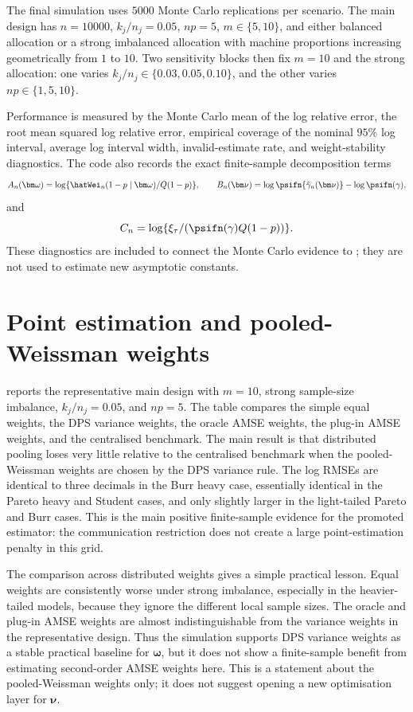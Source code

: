 The final simulation uses \(5000\) Monte Carlo replications per scenario. The
main design has \(n=10000\), \(k_j/n_j=0.05\), \(np=5\),
\(m\in\{5,10\}\), and either balanced allocation or a strong imbalanced
allocation with machine proportions increasing geometrically from \(1\) to
\(10\). Two sensitivity blocks then fix \(m=10\) and the strong allocation:
one varies \(k_j/n_j\in\{0.03,0.05,0.10\}\), and the other varies
\(np\in\{1,5,10\}\).

Performance is measured by the Monte Carlo mean of the log relative error,
the root mean squared log relative error, empirical coverage of the nominal
\(95\%\) log interval, average log interval width, invalid-estimate rate, and
weight-stability diagnostics. The code also records the exact finite-sample
decomposition terms
\[
  A_n(\bm\omega)
  =
  \log\{\hatWei_n(1-p\mid\bm\omega)/Q(1-p)\},
  \qquad
  B_n(\bm\nu)
  =
  \log\psifn\{\hat\gamma_n(\bm\nu)\}-\log\psifn(\gamma),
\]
and
\[
  C_n
  =
  \log\{\xi_\tau/(\psifn(\gamma)Q(1-p))\}.
\]
These diagnostics are included to connect the Monte Carlo evidence to
; they are not used to estimate new
asymptotic constants.

\section{Point estimation and pooled-Weissman weights}
\label{sec:sim:point}

 reports the representative main design with
\(m=10\), strong sample-size imbalance, \(k_j/n_j=0.05\), and \(np=5\). The
table compares the simple equal weights, the DPS variance weights, the oracle
AMSE weights, the plug-in AMSE weights, and the centralised benchmark. The
main result is that distributed pooling loses very little relative to the
centralised benchmark when the pooled-Weissman weights are chosen by the DPS
variance rule. The log RMSEs are identical to three decimals in the Burr heavy
case, essentially identical in the Pareto heavy and Student cases, and only
slightly larger in the light-tailed Pareto and Burr cases. This is the main
positive finite-sample evidence for the promoted estimator: the communication
restriction does not create a large point-estimation penalty in this grid.

The comparison across distributed weights gives a simple practical lesson.
Equal weights are consistently worse under strong imbalance, especially in the
heavier-tailed models, because they ignore the different local sample sizes.
The oracle and plug-in AMSE weights are almost indistinguishable from the
variance weights in the representative design. Thus the simulation supports
DPS variance weights as a stable practical baseline for \(\bm\omega\), but it
does not show a finite-sample benefit from estimating second-order AMSE
weights here. This is a statement about the pooled-Weissman weights only; it
does not suggest opening a new optimisation layer for \(\bm\nu\).

